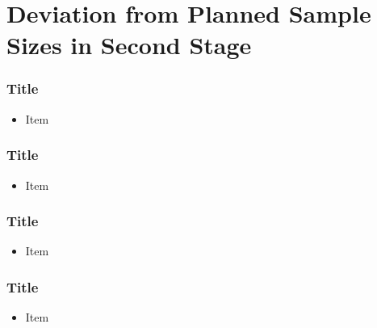 \documentclass{beamer}\usepackage[]{graphicx}\usepackage[]{color}
\begin{document}
\section{Deviation from Planned Sample Sizes in Second Stage}

\begin{frame}
\frametitle{Title}
    \begin{itemize}
        \item Item
    \end{itemize}
\end{frame}

\begin{frame}
\frametitle{Title}
    \begin{itemize}
        \item Item
    \end{itemize}
\end{frame}

\begin{frame}
\frametitle{Title}
    \begin{itemize}
        \item Item
    \end{itemize}
\end{frame}

\begin{frame}
\frametitle{Title}
    \begin{itemize}
        \item Item
    \end{itemize}
\end{frame}
\end{document}
